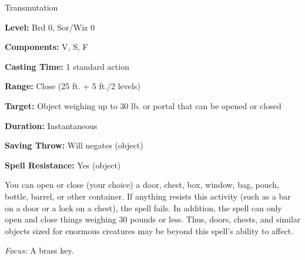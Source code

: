 
Transmutation

\textbf{Level:} Brd 0, Sor/Wiz 0

\textbf{Components:} V, S, F

\textbf{Casting Time:} 1 standard action

\textbf{Range:} Close (25 ft. + 5 ft./2 levels)

\textbf{Target:} Object weighing up to 30 lb. or portal that can be opened or closed

\textbf{Duration:} Instantaneous

\textbf{Saving Throw:} Will negates (object)

\textbf{Spell Resistance:} Yes (object)

You can open or close (your choice) a door, chest, box, window, bag, pouch, bottle, 
barrel, or other container. If anything resists this activity (such as a bar on 
a door or a lock on a chest), the spell fails. In addition, the spell can only 
open and close things weighing 30 pounds or less. Thus, doors, chests, and similar 
objects sized for enormous creatures may be beyond this spell's ability to affect.

\textit{Focus:} A brass key.

